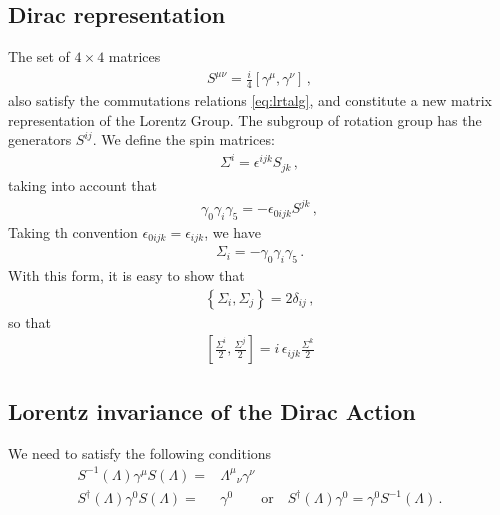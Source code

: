 \begin{inprogress}
  \subsection{Dirac representation}
The set of $4\times 4$ matrices
\begin{align}
  S^{\mu\nu}=\frac{i}{4}\left[\gamma^\mu,\gamma^\nu\right]\,,
\end{align}
also satisfy the commutations relations \eqref{eq:lrtalg}, and constitute a new matrix representation of the Lorentz Group. The subgroup of rotation group has the generators $S^{ij}$. We define the spin matrices:
\begin{align}
  \Sigma^i=\epsilon^{ijk}S_{jk}\,,
\end{align}
taking into account that
\begin{align}
  \gamma_0\gamma_i\gamma_5=-\epsilon_{0ijk}S^{jk}\,,
\end{align}
Taking th convention $\epsilon_{0ijk}=\epsilon_{ijk}$, we have
\begin{align}
  \Sigma_{i}=-\gamma_0\gamma_i\gamma_5\,.
\end{align}
With this form, it is easy to show that
\begin{align}
  \left\{\Sigma_i,\Sigma_j\right\}=2\delta_{ij}\,, 
\end{align}
so that 
\begin{align}
  \left[\frac{\Sigma^i}{2},\frac{\Sigma^j}{2} \right]=i\,\epsilon_{ijk}\frac{\Sigma^k}{2}
\end{align}
\end{inprogress}



\subsection{Lorentz invariance of the Dirac Action}
We need to satisfy the following conditions
\begin{align}
  S^{-1}(\Lambda) \gamma^\mu S(\Lambda)=&{\Lambda^\mu}_\nu\gamma^\nu\nonumber\\
  S^\dagger(\Lambda) \gamma^0 S(\Lambda)=&\gamma^0\qquad\text{or}\quad S^\dagger(\Lambda) \gamma^0= \gamma^0S^{-1}(\Lambda)\, .
\end{align}

